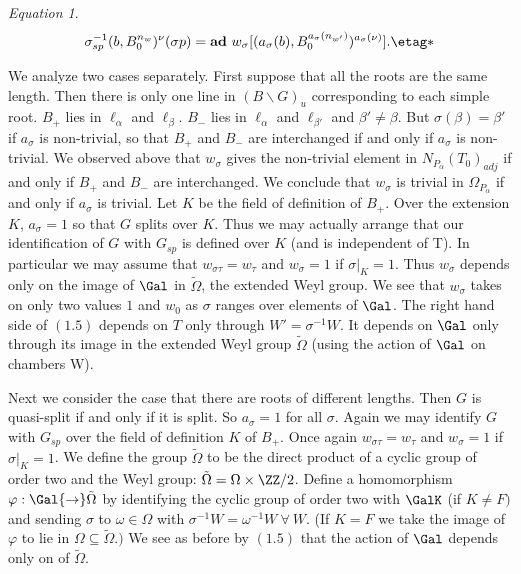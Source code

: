 \documentclass{memo-l}
\theoremstyle{definition}
\theoremstyle{remark}
\newtheorem{eqn}[theorem]{Equation}
\numberwithin{section}{chapter}
\numberwithin{equation}{chapter}
\begin{document}
\begin{eqn} %
$$
{\sigma}_{sp}^{-1}(b,B_{0}^{n_{w}})^{{\nu}} ({\sigma}p)  =
{\bold {ad}}\
w_{{\sigma}}[(a_{{\sigma}}(b),B_{0}^{a_{{\sigma}}(n_{w'})})^{a_{{\sigma}}({\nu})}]. \etag *
$$
\end{eqn}

   We analyze two cases separately.  First suppose that all the roots are
the same length.  Then there is only one line in $(B\backslash G)_{u}$
corresponding to each simple root.  $B_{+}$ lies in ${\ell}_{{\alpha}}$ and
${\ell}_{{\beta}}$.  $B_{-}$ lies in ${\ell}_{{\alpha}}$ and
${\ell}_{{\beta}'}$ and ${\beta}'  \ne {\beta}$.  But
${\sigma}({\beta}) = {\beta}'$ if $a_{{\sigma}}$ is non-trivial, so that
$B_{+}$ and $B_{-}$ are interchanged if and only if $a_{{\sigma}}$ is
non-trivial.  We observed above that $w_{{\sigma}}$ gives the non-trivial
element in ${N}_{P_\alpha} (T_{0})_{adj}$ if and only if $B_{+}$ and $B_{-}$
are interchanged.  We conclude that $w_{{\sigma}}$ is trivial in
${\Omega}_{P_\alpha}$ if and only if $a_{{\sigma}}$ is trivial.  Let $K$ be
the field of definition of $B_{+}$.  Over the extension $K$, $a_{{\sigma}} = 1$
so that $G$ splits over $K$.  Thus we may actually arrange that our
identification of $G$ with $G_{sp}$ is defined over $K$ (and is independent
of T).  In particular we may assume that $w_{{\sigma}{\tau}} = w_{{\tau}}$
and $w_{{\sigma}} = 1$ if ${\sigma}\vert _{K}  =  1$.  Thus $w_{{\sigma}}$
depends only on the image of $\Gal$ in $\tilde {\Omega}$, the extended
Weyl group. We see
that $w_{{\sigma}}$ takes on only two values $1$ and $w_{0}$ as ${\sigma}$
ranges over elements of $\Gal$.  The right hand side of $(1.5)$
depends on $T$ only through $W'  =  {\sigma}^{-1}W$.  It depends on $\Gal$
only through its image in the extended Weyl group $\tilde {\Omega}$
(using the action of $\Gal$ on chambers W).

   Next we consider the case that there are roots of different lengths.
Then $G$ is quasi-split if and only if it is split.  So $a_{{\sigma}} = 1$
for all ${\sigma}$.  Again we may identify $G$ with $G_{sp}$ over the field
of definition $K$ of $B_{+}$.  Once again $w_{{\sigma}{\tau}} = w_{{\tau}}$
and $w_{{\sigma}} = 1$ if ${\sigma}\vert _{K}  =  1$.  We define the group
$\tilde {\Omega}$ to be the direct product of a cyclic group of order two
and the Weyl group: $\tilde {\Omega}  =  {\Omega} \times {\ZZ}/2$.
Define a homomorphism ${\varphi}: \Gal {\to} \tilde{\Omega}$ by
identifying the cyclic group of order two with $\GalK$ (if $K  \ne F)$ and
sending ${\sigma}$ to ${\omega}  \in  {\Omega}$ with ${\sigma}^{-1}W  =
{\omega}^{-1}W {\ \forall\ } W$.  (If $K = F$ we take the image of
${\varphi}$ to lie in ${\Omega} {\subseteq} \tilde{\Omega} .)$ We see as
before by $(1.5)$ that the action of $\Gal$ depends only on
of $\tilde{\Omega} .$
\end{document}
